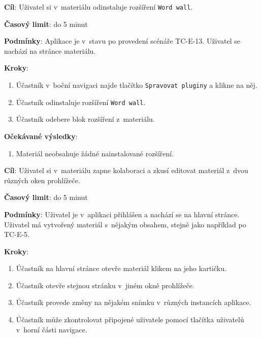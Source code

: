 \vspace{1em}

\textbf{Cíl}: Uživatel si v~materiálu odinstaluje rozšíření \verb|Word wall|.

\textbf{Časový limit}: do 5 minut

\textbf{Podmínky}:  Aplikace je v~stavu po provedení scénáře TC-E-13. Uživatel se nachází na stránce materiálu.

\textbf{Kroky}:

\begin{enumerate}[leftmargin=1.4cm]
    \item Účastník v~boční navigaci najde tlačítko \verb|Spravovat pluginy| a klikne na něj.
    \item Účastník odinstaluje rozšíření \verb|Word wall|.
    \item Účastník odebere blok rozšíření z~materiálu.
\end{enumerate}

\textbf{Očekávané výsledky}:

\begin{enumerate}[leftmargin=1.4cm]
    \item Materiál neobsahuje žádné nainstalované rozšíření.
\end{enumerate}




\vspace{1em}

\textbf{Cíl}: Uživatel si v~materiálu zapne kolaboraci a zkusí editovat materiál z~dvou různých oken prohlížeče. 

\textbf{Časový limit}: do 5 minut

\textbf{Podmínky}:  Uživatel je v~aplikaci přihlášen a nachází se na hlavní stránce.  Uživatel má vytvořený materiál s~nějakým obsahem, stejně jako například po TC-E-5.

\textbf{Kroky}:

\begin{enumerate}[leftmargin=1.4cm]
    \item Účastník na hlavní stránce otevře materiál klikem na jeho kartičku.
    \item Účastník otevře stejnou stránku v~jiném okně prohlížeče.
    \item Účastník provede změny na nějakém snímku v~různých instancích aplikace.
    \item Účastník může zkontrolovat připojené uživatele pomocí tlačítka uživatelů v~horní části navigace.
\end{enumerate}

